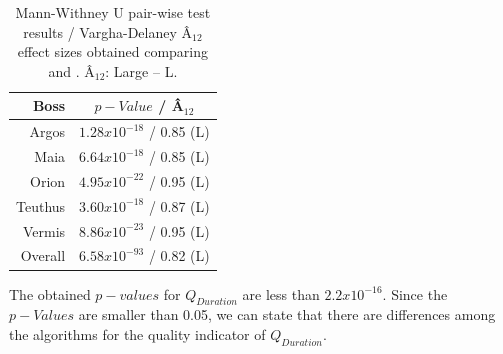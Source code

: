 \begin{table}[ht!]
    \centering
    \caption{Mann-Withney U pair-wise test results / Vargha-Delaney Â$_{12}$ effect sizes obtained comparing \simhotep{} and \timhotep{}. Â$_{12}$: Large -- L.}
    \label{tab:results_rq2}
    \begin{tabular}{@{}rc@{}}
    \toprule
    Boss    & $p-Value$ / Â$_{12}$           \\ \midrule 
    Argos   & $1.28x10^{-18}$ / 0.85 (L)     \\
    Maia    & $6.64x10^{-18}$ / 0.85 (L)     \\
    Orion   & $4.95x10^{-22}$ / 0.95 (L)     \\
    Teuthus & $3.60x10^{-18}$ / 0.87 (L)     \\
    Vermis  & $8.86x10^{-23}$ / 0.95 (L)     \\
    Overall & $6.58x10^{-93}$ / 0.82 (L)     \\
    \bottomrule
    \end{tabular}
    \end{table}



The obtained $p-values$ for $Q_{Duration}$ are less than $2.2x10^{-16}$. Since the $p-Values$ are smaller than 0.05, we can state that there are differences among the algorithms for the quality indicator of $Q_{Duration}$.


